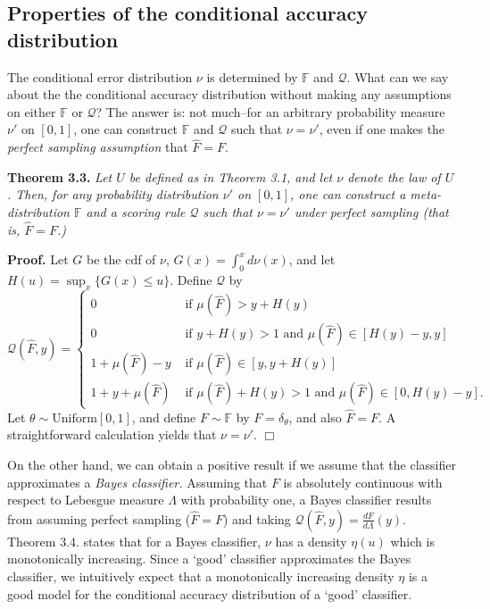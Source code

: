 \documentclass{article}
\begin{document}
\subsection{Properties of the conditional accuracy distribution}

The conditional error distribution $\nu$ is determined by $\mathbb{F}$
and $\mathcal{Q}$.  What can we say about the the conditional accuracy
distribution without making any assumptions on either $\mathbb{F}$ or
$\mathcal{Q}$?  The answer is: not much--for an arbitrary probability
measure $\nu'$ on $[0,1]$, one can construct $\mathbb{F}$ and
$\mathcal{Q}$ such that $\nu = \nu'$, even if one makes the \emph{perfect sampling assumption} that $\hat{F}=F.$

\noindent\textbf{Theorem 3.3.} \emph{ Let $U$ be defined as in Theorem
  3.1, and let $\nu$ denote the law of $U$.  Then, for any probability
  distribution $\nu'$ on $[0,1]$, one can construct a
  meta-distribution $\mathbb{F}$ and a scoring rule $\mathcal{Q}$ such
  that $\nu = \nu'$ under perfect sampling (that is, $\hat{F} = F$.)  }

\textbf{Proof.}  
Let $G$ be the cdf of $\nu$, $G(x) = \int_0^x d\nu(x)$, and let $H(u) = \sup_x \{G(x) \leq u\}$.
Define $\mathcal{Q}$ by
\[
\mathcal{Q}(\hat{F}, y) = \begin{cases}
0 &\text{ if }\mu(\hat{F}) > y + H(y)\\
0 & \text{ if }y + H(y) > 1 \text{ and }\mu(\hat{F}) \in [H(y) - y, y]\\
1 + \mu(\hat{F}) - y &\text{ if } \mu(\hat{F}) \in [y, y + H(y)]\\
1 + y + \mu(\hat{F}) &\text{ if }\mu(\hat{F}) + H(y) > 1 \text{ and }\mu(\hat{F}) \in [0, H(y) - y]. 
\end{cases}
\]
Let $\theta \sim \text{Uniform}[0,1]$,
and define $F \sim \mathbb{F}$ by $F = \delta_\theta$, and also $\hat{F} = F.$
A straightforward calculation yields that $\nu = \nu'$. $\Box$

On the other hand, we can obtain a positive result if we assume that
the classifier approximates a \emph{Bayes classifier.}
Assuming that $F$ is absolutely continuous with respect to Lebesgue measure $\Lambda$ with probability one,
a Bayes classifier results from assuming perfect sampling ($\hat{F} = F$) and taking
$\mathcal{Q}(\hat{F}, y) = \frac{dF}{d\Lambda}(y)$.
Theorem 3.4. states that for a Bayes classifier, $\nu$ has a density $\eta(u)$ which is monotonically increasing.
Since a `good' classifier approximates the Bayes classifier, we intuitively expect that a monotonically
increasing density $\eta$ is a good model for the conditional accuracy distribution of a `good' classifier.
\end{document}
